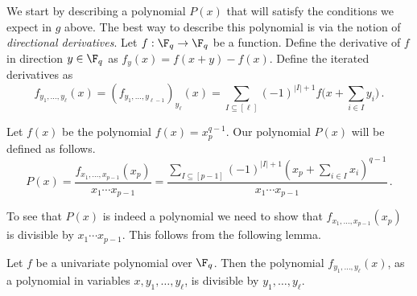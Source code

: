 We start by describing a polynomial $P(x)$ that will satisfy the conditions we expect in $g$ above. The best way to describe this polynomial is via the notion of \emph{directional derivatives}. Let $f: \F_q \to \F_q$ be a function. Define the
derivative of $f$ in direction $y \in \F_q$ as $f_y(x) = f(x+y) - f(x)$.
Define the iterated derivatives as
\[f_{y_1,\ldots,y_\ell}(x) = (f_{y_1,\ldots,y_{\ell-1}})_{y_\ell}(x) = \sum_{I \subseteq [\ell]} (-1)^{|I|+1} f\bigg(x + \sum_{i \in I}y_i\bigg) \,.\]

Let $f(x)$ be the polynomial $f(x)=x_p^{q-1}$. Our polynomial $P(x)$ will be defined as follows.
\begin{equation}\label{eq:P(x)}
P(x) = \frac {f_{x_1,\ldots,x_{p-1}}(x_p)} {x_1 \cdots x_{p-1}} =
\frac {\sum_{I \subseteq [p-1]} (-1)^{|I|+1} (x_p + \sum_{i \in I} x_i)^{q-1}} {x_1 \cdots x_{p-1}}\,.
\end{equation}

To see that $P(x)$ is indeed a polynomial we need to show that $f_{x_1,\ldots,x_{p-1}}(x_p)$ is divisible by $x_1 \cdots x_{p-1}$. 
This  follows from the following lemma.

\begin{lemma}
Let $f$ be a univariate polynomial over $\F_q$. Then the polynomial $f_{y_1,\ldots,y_{\ell}}(x)$, as a polynomial in variables $x,y_1,\ldots,y_\ell$, is divisible by $y_1,\ldots,y_{\ell}$.
\end{lemma}

